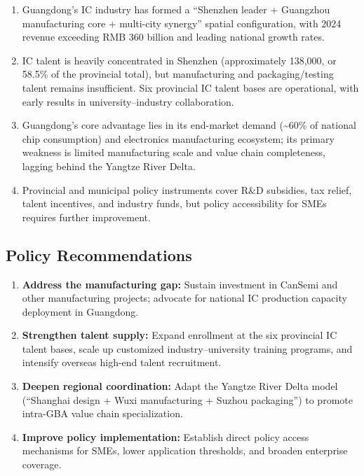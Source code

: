 \documentclass[12pt,a4paper]{article}
\begin{document}
\begin{enumerate}[label=(\arabic*)]
    \item Guangdong's IC industry has formed a ``Shenzhen leader +
          Guangzhou manufacturing core + multi-city synergy'' spatial
          configuration, with 2024 revenue exceeding RMB 360 billion
          and leading national growth rates.
    \item IC talent is heavily concentrated in Shenzhen (approximately
          138,000, or 58.5\% of the provincial total),
          but manufacturing and packaging/testing talent remains insufficient.
          Six provincial IC talent bases are operational, with early results
          in university--industry collaboration.
    \item Guangdong's core advantage lies in its end-market demand
          (\textasciitilde60\% of national chip consumption) and
          electronics manufacturing ecosystem; its primary weakness is
          limited manufacturing scale and value chain completeness,
          lagging behind the Yangtze River Delta.
    \item Provincial and municipal policy instruments cover R\&D subsidies,
          tax relief, talent incentives, and industry funds, but policy
          accessibility for SMEs requires further improvement.
\end{enumerate}

\subsection{Policy Recommendations}
\label{sec:recommendations}

\begin{enumerate}[label=(\arabic*)]
    \item \textbf{Address the manufacturing gap:} Sustain investment in
          CanSemi and other manufacturing projects; advocate for national
          IC production capacity deployment in Guangdong.
    \item \textbf{Strengthen talent supply:} Expand enrollment at the six
          provincial IC talent bases, scale up customized industry--university
          training programs, and intensify overseas high-end talent recruitment.
    \item \textbf{Deepen regional coordination:} Adapt the Yangtze River
          Delta model (``Shanghai design + Wuxi manufacturing + Suzhou
          packaging'') to promote intra-GBA value chain specialization.
    \item \textbf{Improve policy implementation:} Establish direct policy
          access mechanisms for SMEs, lower application thresholds, and
          broaden enterprise coverage.
\end{enumerate}
\end{document}
